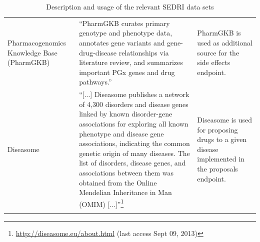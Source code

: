 \begin{longtable}{p{}|p{}|p{}}
  Pharmaco\-genomics Knowledge Base (PharmGKB) & ``PharmGKB curates primary genotype and phenotype data, annotates gene variants and gene-drug-disease relationships via literature review, and summarizes important PGx genes and drug pathways.''\cite{hewett2002pharmgkb} & PharmGKB is used as additional source for the side effects endpoint.\\
  Diseasome & ``[...] Diseasome publishes a network of 4,300 disorders and disease genes linked by known disorder-gene associations for exploring all known phenotype and disease gene associations, indicating the common genetic origin of many diseases. The list of disorders, disease genes, and associations between them was obtained from the Online Mendelian Inheritance in Man (OMIM) [...]''\footnote{\url{http://diseasome.eu/about.html} (last access Sept 09, 2013)} & Diseasome is used for proposing drugs to a given disease implemented in the proposals endpoint.\\
\hline
\caption{Description and usage of the relevant SEDRI data sets}
\end{longtable}

